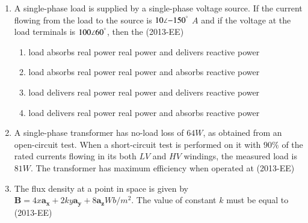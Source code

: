 \documentclass[journal]{IEEEtran}
\begin{document}
\begin{enumerate}
    \item A single-phase load is supplied by a single-phase voltage source. If the current flowing from the load to the source is $10 \angle{-150^\degree}$ $A$ and if the voltage at the load terminals is $100 \angle 60^\degree$, then the \hfill(2013-EE)
    \begin{enumerate}
        \item load absorbs real power real power and delivers reactive power
        \item load absorbs real power real power and absorbs reactive power
        \item load delivers real power real power and delivers reactive power
        \item load delivers real power real power and absorbs reactive power
    \end{enumerate}
    \item A single-phase transformer has no-load loss of $64W$, as obtained from an open-circuit test. When a short-circuit test is performed on it with $90\%$ of the rated currents flowing in its both $LV$ and $HV$ windings, the measured load is $81W$. The transformer has maximum efficiency when operated at \hfill(2013-EE)
    \begin{enumerate}
    \end{enumerate}
    \item The flux density at a point in space is given by $\textbf{B} = 4x \textbf{a}_\textbf{x} + 2ky\textbf{a}_\textbf{y} + 8\textbf{a}_\textbf{z} Wb/m^2$. The value of constant $k$ must be equal to \hfill(2013-EE) 
    \begin{enumerate}
    \end{enumerate}

\end{enumerate}
\end{document}
